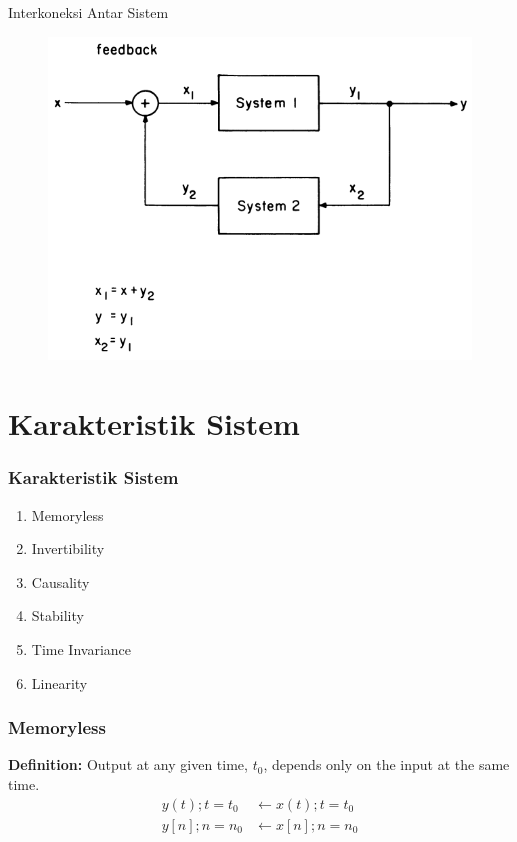 \documentclass[pdflatex,compress,mathserif]{beamer}
\begin{document}
\begin{frame}{Interkoneksi Antar Sistem}
	\begin{figure}
		\centering
		\includegraphics[height=0.8\textheight]{img/02.slide_12}
	\end{figure}
\end{frame}

\section{Karakteristik Sistem}

\begin{frame}
	\frametitle{Karakteristik Sistem}
	\begin{enumerate}
		\item Memoryless
		\item Invertibility
		\item Causality
		\item Stability
		\item Time Invariance
		\item Linearity
	\end{enumerate}
\end{frame}

\begin{frame}
	\frametitle{Memoryless}
	\textbf{Definition:} Output at any given time, $ t_0 $,  depends only on the input at the same time.
	\begin{align*}
		y(t); t=t_0 &\leftarrow x(t); t = t_0 \\
		y[n]; n=n_0 &\leftarrow x[n]; n = n_0
	\end{align*}
\end{frame}
\end{document}

